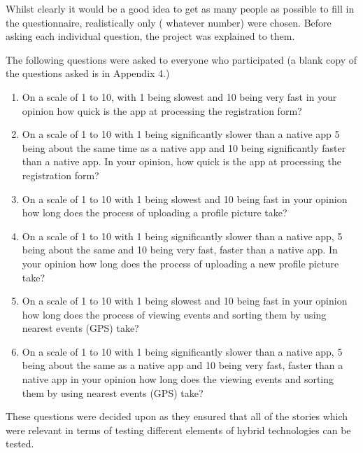 Whilst clearly it would be a good idea to get as many people as possible to fill in the questionnaire, realistically only ( whatever number) were chosen. Before asking each individual question, the project was explained to them.

The following questions were asked to everyone who participated (a blank copy of the questions asked is in  Appendix 4.)

\begin{enumerate}
\item On a scale of 1 to 10, with 1 being slowest and 10 being very fast in your opinion how quick is the app at processing the registration form?
\item On a scale of 1 to 10 with 1 being significantly slower than a native app 5 being about the same time as a native app and 10 being significantly faster than a native app. In your opinion, how quick is the app at processing the registration form?
\item On a scale of 1 to 10 with 1 being slowest and 10 being fast in your opinion how long does the process of uploading a profile picture take?
\item On a scale of 1 to 10 with 1 being significantly slower than a native app, 5 being about the same and 10 being very fast, faster than a native app. In your opinion how long does the process of uploading a new profile picture take?
\item On a scale of 1 to 10 with 1 being slowest and 10 being fast in your opinion how long does the process of viewing events and sorting them by using nearest events (GPS) take?
\item On a scale of 1 to 10 with 1 being significantly slower than a native app, 5 being about the same as a native app and 10 being very fast, faster than a native app in your opinion how long does the viewing events and sorting them by using nearest events (GPS) take?
\end{enumerate}
These questions were decided upon as they ensured that all of the stories which were relevant in terms of testing different elements of hybrid technologies can be tested.

